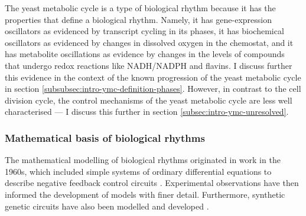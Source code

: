 The yeast metabolic cycle is a type of biological rhythm because it has the properties that define a biological rhythm.
Namely, it has gene-expression oscillators as evidenced by transcript cycling in its phases,
it has biochemical oscillators as evidenced by changes in dissolved oxygen in the chemostat,
and it has metabolite oscillations as evidence by changes in the levels of compounds that undergo redox reactions like NADH/NADPH and flavins.
I discuss further this evidence in the context of the known progression of the yeast metabolic cycle in section \ref{subsubsec:intro-ymc-definition-phases}.
However, in contrast to the cell division cycle, the control mechanisms of the yeast metabolic cycle are less well characterised --- I discuss this further in section \ref{subsec:intro-ymc-unresolved}.

\subsubsection{Mathematical basis of biological rhythms}
\label{subsubsec:intro-ymc-biological_rhythms-theoretical_basis}

The mathematical modelling of biological rhythms originated in work in the 1960s, which included simple systems of ordinary differential equations to describe negative feedback control circuits \parencite{goodwinOscillatoryBehaviorEnzymatic1965, griffithMathematicsCellularControl1968}.
Experimental observations have then informed the development of models with finer detail.
Furthermore, synthetic genetic circuits have also been modelled and developed \parencite{elowitzSyntheticOscillatoryNetwork2000}.

